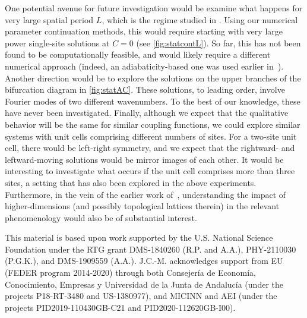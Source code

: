 \documentclass[reprint, amsmath,amssymb,aps,pre]{revtex4-2}
\begin{document}
One potential avenue for future investigation would be examine what happens for very large spatial period $L$, which is the regime studied in \cite{Jurgensen2021}. Using our numerical parameter continuation methods, this would require starting with very large power single-site solutions at $C=0$ (see \cref{fig:statcontL}). So far, this has not been found to be computationally feasible, and would likely require a different numerical approach
(indeed, an adiabaticity-based one was used earlier in~\cite{Jurgensen2021}). Another direction would be to explore the solutions on the upper branches of the bifurcation diagram in \cref{fig:statAC}. These solutions, to leading order, involve Fourier modes of two different wavenumbers. To the best of our knowledge, these have never been investigated. Finally, although we expect that the qualitative behavior will be the same for similar coupling functions, we could explore similar systems with unit cells comprising different numbers of sites. For a two-site unit cell, there would be left-right symmetry, and we expect that the rightward- and leftward-moving solutions would be mirror images of each other. It would be interesting to investigate what occurs if the unit cell comprises more than three sites, a setting that has also been explored in the above experiments.
Furthermore, in the vein of the earlier work of~\cite{PhysRevE.105.044211}, understanding
the impact of higher-dimensions (and possibly topological lattices therein) in the relevant
phenomenology would also be of substantial interest.

\begin{acknowledgments}
This material is based upon work supported by the U.S. National Science Foundation under the RTG grant DMS-1840260 (R.P. and A.A.), PHY-2110030 (P.G.K.), and DMS-1909559 (A.A.). J.C.-M. acknowledges support from EU (FEDER program 2014-2020) through both Consejería de Economía, Conocimiento, Empresas y Universidad de la Junta de Andalucía (under the projects P18-RT-3480 and US-1380977), and MICINN and AEI (under the projects PID2019-110430GB-C21 and PID2020-112620GB-I00).
\end{acknowledgments}



\end{document}
